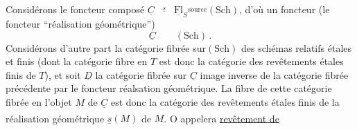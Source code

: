 Considérons le foncteur composé $\underline{C}\overset{\underline{s}}{\qquad}\underline{\mathrm{Fl}}_S\overset{\mathrm{source}}{\qquad}(\mathrm{Sch})$, d'où un foncteur (le foncteur ``réalisation géométrique'')
\[
\underline{C}\qquad(\mathrm{Sch})\,.
\]
Considérons d'autre part la catégorie fibrée sur$(\mathrm{Sch})$ des schémas relatifs étales et finis (dont la catégorie fibre en $T$ est donc la catégorie des revêtements étales finis de $T$), et soit $\underline{D}$ la catégorie fibrée sur $\underline{C}$ image inverse de la catégorie fibrée précédente par le foncteur réalsation géométrique. La fibre de cette catégorie fibrée en l'objet $M$ de $\underline{C}$ est donc la catégorie des revêtements étales finis de la réalisation géométrique $\underline{s}(M)$ de $M$. O\textsuperscript{} appelera \uline{revêtement de} 
